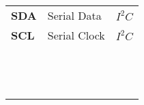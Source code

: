 \begin{tabular}{>{\bfseries}lll}
    SDA     & Serial Data       & $ I^2C $\\
    SCL     & Serial Clock      & $ I^2C $\\
    & & \\
    & & \\
    & & \\
    & & \\
    & & \\ 
    & & \\
    & & \\
    & & \\
    & & \\
    & & \\ 
    & & \\
    & & \\
    & & \\
    
\end{tabular}
